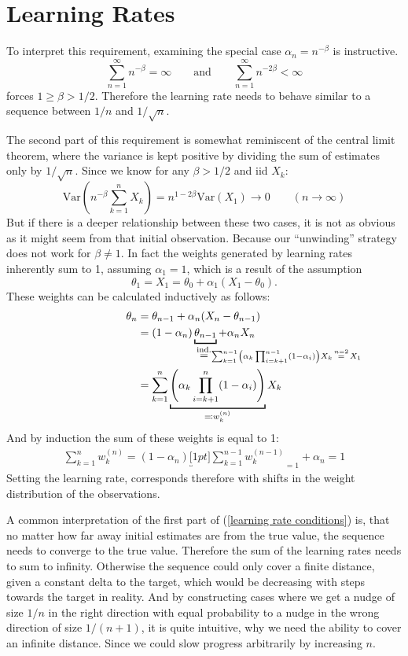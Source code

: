 \section{Learning Rates}\label{learning rate}
To interpret this requirement, examining the special case \(\alpha_n=n^{-\beta}\) is instructive.
\[
    \sum_{n=1}^\infty n^{-\beta}=\infty \qquad \text{and}\qquad \sum_{n=1}^\infty n^{-2\beta}<\infty
\]
forces \(1\ge \beta >1/2\). Therefore the learning rate needs to behave similar to a sequence between \(1/n\) and \(1/\sqrt{n}\). 

The second part of this requirement is somewhat reminiscent of the central limit theorem, where the variance is kept positive by dividing the sum of estimates only by \(1/\sqrt{n}\). Since we know for any \(\beta>1/2\) and iid \(X_k\):
\[
    \text{Var}\left(n^{-\beta}\sum_{k=1}^n X_k \right)=n^{1-2\beta}\text{Var}(X_1)\to 0 \qquad (n\to \infty)
\]
But if there is a deeper relationship between these two cases, it is not as obvious as it might seem from that initial observation. Because our ``unwinding'' strategy does not work for \(\beta \neq 1\). In fact the weights generated by learning rates inherently sum to 1, assuming \(\alpha_1=1\), which is a result of the assumption 
\[
    \theta_1=X_1=\theta_0+\alpha_1(X_1-\theta_0).
\]
These weights can be calculated inductively as follows:
\begin{align*}
    \theta_n&=\theta_{n-1} + \alpha_n(X_n -\theta_{n-1})\\
    &=(1-\alpha_n)\underbracket[1pt]{\theta_{n-1}}_{
        \lxeq{\text{ind.}}
        \mathrlap{\sum_{k=1}^{n-1} \left(\alpha_k \prod_{i=k+1}^{n-1}(1-\alpha_i)\right)X_k \xeq{n=2} X_1}
    }
    + \alpha_n X_n\\
    & = \sum_{k=1}^n \underbracket[1pt]{
        \left(\alpha_k \prod_{i=k+1}^{n}(1-\alpha_i)\right)
        }_{
            \eqqcolon w_k^{(n)}
        } X_k
\end{align*}
And by induction the sum of these weights is equal to 1:
\begin{align*}
    \sum_{k=1}^n w_k^{(n)} = (1-\alpha_n)\underbracket[1pt]{\sum_{k=1}^{n-1}w_k^{(n-1)}}_{=1} + \alpha_n =1
\end{align*}
Setting the learning rate, corresponds therefore with shifts in the weight distribution of the observations.


A common interpretation of the first part of (\ref{learning rate conditions}) is, that no matter how far away initial estimates are from the true value, the sequence needs to converge to the true value. Therefore the sum of the learning rates needs to sum to infinity. Otherwise the sequence could only cover a finite distance, given a constant delta to the target, which would be decreasing with steps towards the target in reality. And by constructing cases where we get a nudge of size \(1/n\) in the right direction with equal probability to a nudge in the wrong direction of size \(1/(n+1)\), it is quite intuitive, why we need the ability to cover an infinite distance. Since we could slow progress arbitrarily by increasing \(n\). 

